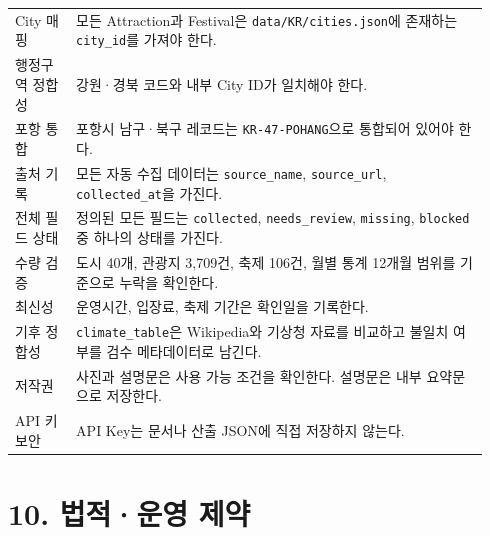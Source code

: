 \documentclass[12pt,a4paper]{article}
\newcommand{\DocNeedspace}[1]{\par\ifdim\dimexpr\pagegoal-\pagetotal\relax<#1\newpage\fi}
\newcommand{\TocNoChildTight}{\vspace{-0.28em}}
\begin{document}
\DocNeedspace{26\baselineskip}
\begin{small}
\begin{longtable}{@{}>{\RaggedRight\arraybackslash}m{0.121\linewidth}>{\RaggedRight\arraybackslash}m{0.819\linewidth}@{}}
\toprule
\multicolumn{1}{>{\centering\arraybackslash}m{0.121\linewidth}}{\textbf{검증 항목}} & \multicolumn{1}{>{\centering\arraybackslash}m{0.819\linewidth}}{\textbf{기준}} \\
\midrule
\endhead
City 매핑 & 모든 Attraction과 Festival은 \texttt{data/\allowbreak{}KR/\allowbreak{}cities.\allowbreak{}json}에 존재하는 \texttt{city\_\allowbreak{}id}를 가져야 한다. \\
행정구역 정합성 & 강원·경북 코드와 내부 City ID가 일치해야 한다. \\
포항 통합 & 포항시 남구·북구 레코드는 \texttt{KR-\allowbreak{}47-\allowbreak{}POHANG}으로 통합되어 있어야 한다. \\
출처 기록 & 모든 자동 수집 데이터는 \texttt{source\_\allowbreak{}name}, \texttt{source\_\allowbreak{}url}, \texttt{collected\_\allowbreak{}at}을 가진다. \\
전체 필드 상태 & 정의된 모든 필드는 \texttt{collected}, \texttt{needs\_\allowbreak{}review}, \texttt{missing}, \texttt{blocked} 중 하나의 상태를 가진다. \\
수량 검증 & 도시 40개, 관광지 3,709건, 축제 106건, 월별 통계 12개월 범위를 기준으로 누락을 확인한다. \\
최신성 & 운영시간, 입장료, 축제 기간은 확인일을 기록한다. \\
기후 정합성 & \texttt{climate\_\allowbreak{}table}은 Wikipedia와 기상청 자료를 비교하고 불일치 여부를 검수 메타데이터로 남긴다. \\
저작권 & 사진과 설명문은 사용 가능 조건을 확인한다. 설명문은 내부 요약문으로 저장한다. \\
API 키 보안 & API Key는 문서나 산출 JSON에 직접 저장하지 않는다. \\
\bottomrule
\end{longtable}
\end{small}


\newpage

\DocNeedspace{10\baselineskip}
\section*{10. 법적·운영 제약}
\addtocontents{toc}{\protect\TocNoChildTight}
\end{document}

